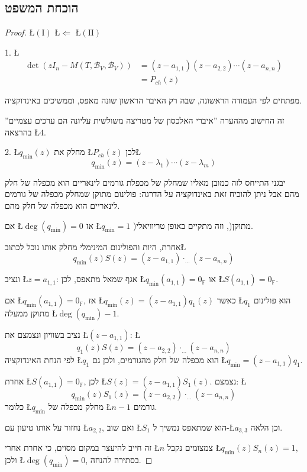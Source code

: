 \documentclass[english,hebrew]{article}
\begin{document}
\subsection{הוכחת המשפט}
\begin{proof}
\L{$(\text{I})$} \L{$\Leftarrow$} \L{$(\text{II})$}

1. \L{%
\begin{align*}
\det\left(zI_{n}-M(T,\mathcal{B}_{V},\mathcal{B}_{V})\right) & =(z-a_{1,1})(z-a_{2,2})\cdots(z-a_{n,n})\\
 & =P_{ch}(z)
\end{align*}
}%

מפתחים לפי העמודה הראשונה, שבה רק האיבר הראשון שונה מאפס, וממשיכים
באינדוקציה.

זה החישוב מההערה \textquotedblright איברי האלכסון של מטריצה משולשית
עליונה הם ערכים עצמיים\textquotedblright{} בהרצאה \L{$4$}.

2. \L{$q_{\min}(z)$} מחלק את \L{$P_{ch}(z)$} לכן\L{%
\[
q_{\min}(z)=(z-\lambda_{1})\cdots(z-\lambda_{m})
\]
}%

יבגני התייחס לזה כמובן מאליו שמחלק של מכפלת גורמים לינאריים הוא מכפלה
של חלק מהם אבל ניתן להוכיח זאת באינדוקציה על הדרגה: פולינום מתוקן
שמחלק מכפלה של גורמים לינאריים הוא מכפלה של חלק מהם.

אם \L{$\deg(q_{\min})=0$} אז \L{$q_{\min}=1$} )מתוקן(, וזה מתקיים
באופן טריוויאלי.

אחרת, היות והפולינום המינימלי מחלק אותו נוכל לכתוב\L{%
\[
q_{\min}(z)S(z)=(z-a_{1,1})\cdot_{\dots}(z-a_{n,n})
\]
}%

ונציב \L{$z=a_{1,1}$}: אגף שמאל מתאפס, לכן \L{$q_{\min}(a_{1,1})=0_{\mathbb{F}}$}
או \L{$S(a_{1,1})=0_{\mathbb{F}}$}.

אם \L{$q_{\min}(a_{1,1})=0_{\mathbb{F}}$}, אז \L{$q_{\min}(z)=(z-a_{1,1})q_{1}(z)$}
כאשר \L{$q_{1}$} הוא פולינום מתוקן ממעלה \L{$\deg(q_{\min})-1$}. 

נציב בשוויון ונצמצם את \L{$(z-a_{1,1})$}: \L{%
\[
q_{1}(z)S(z)=(z-a_{2,2})\cdot_{\dots}(z-a_{n,n})
\]
}%
לפי הנחת האינדוקציה \L{$q_{1}$} הוא מכפלה של חלק מהגורמים, ולכן גם
\L{$q_{\min}=(z-a_{1,1})q_{1}$}.

אחרת \L{$S(a_{1,1})=0_{\mathbb{F}}$}, לכן \L{$S(z)=(z-a_{1,1})S_{1}(z)$}.
נצמצם: \L{%
\[
q_{\min}(z)S_{1}(z)=(z-a_{2,2})\cdot_{\dots}(z-a_{n,n})
\]
}%
כלומר \L{$q_{\min}$} מחלק מכפלה של \L{$n-1$} גורמים.

נחזור על אותו טיעון עם \L{$a_{2,2}$}, ואם שוב \L{$S_{1}$} הוא שמתאפס
נמשיך ל-\L{$a_{3,3}$} וכן הלאה.

זה חייב להיעצר במקום מסוים, כי אחרת אחרי \L{$n$} צמצומים נקבל \L{$q_{\min}(z)S_{n}(z)=1$},
ולכן \L{$\deg(q_{\min})=0$}, בסתירה להנחה.


\end{proof}
\end{document}

